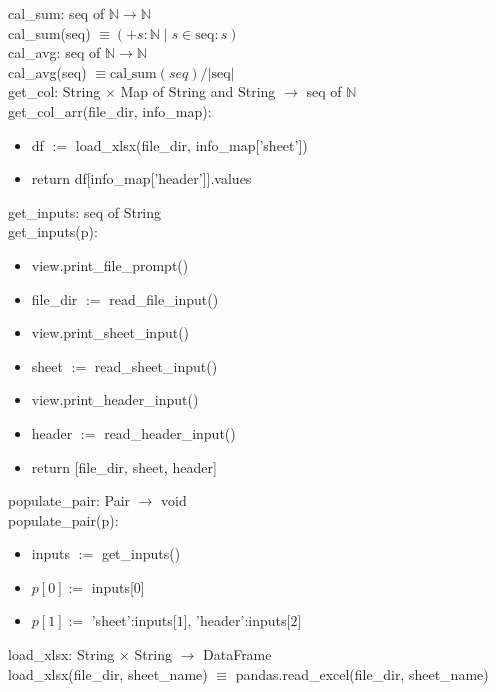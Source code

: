 \documentclass[12pt]{article}
\begin{document}
\noindent cal\_sum: seq of $\mathbb{N} \rightarrow \mathbb{N}$\\
cal\_sum(seq) $\equiv (+s:\mathbb{N} \; | \; s \in \text{seq} : s)$ \\

\noindent cal\_avg: seq of $\mathbb{N} \rightarrow \mathbb{N}$\\
cal\_avg(seq) $\equiv \text{cal\_sum}(seq) / |\text{seq}|$\\

\noindent get\_col: String $\times$ Map of String and String $\rightarrow$ seq of $\mathbb{N}$\\
get\_col\_arr(file\_dir, info\_map):
\begin{itemize}[\null]
  \item df $:=$ load\_xlsx(file\_dir, info\_map['sheet'])
  \item return df[info\_map['header']].values
\end{itemize}



\noindent get\_inputs: seq of String\\
get\_inputs(p): 
\begin{itemize}[\null]
  \item view.print\_file\_prompt()
  \item file\_dir $:=$ read\_file\_input()
  \item view.print\_sheet\_input()
  \item sheet $:=$ read\_sheet\_input()
  \item view.print\_header\_input()
  \item header $:=$ read\_header\_input()
  \item return [file\_dir, sheet, header]
\end{itemize}

\noindent populate\_pair: Pair $\rightarrow$ void\\
populate\_pair(p): 
\begin{itemize}[\null]
  \item inputs $:=$ get\_inputs()
  \item $p[0] :=$ inputs[$0$]
  \item $p[1] :=$ {'sheet':inputs[$1$], 'header':inputs[$2$]}
\end{itemize}

\noindent load\_xlsx: String $\times$ String $\rightarrow$ DataFrame\\
load\_xlsx(file\_dir, sheet\_name) $\equiv$ pandas.read\_excel(file\_dir, sheet\_name)
\end{document}
